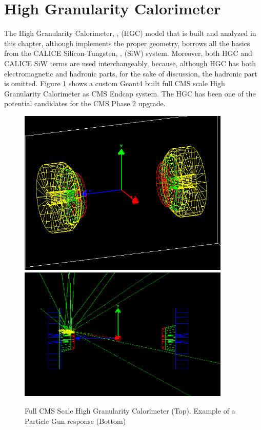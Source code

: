 \section{High Granularity Calorimeter} \label{section:simulations_hgc}
The High Granularity Calorimeter, \cite{Magnan:2017exp}, (HGC) model that is built and analyzed in this chapter, although implements the proper geometry, borrows all the basics from the CALICE Silicon-Tungsten, \cite{Adloff:2008aa}, (SiW) system. Moreover, both {\sc HGC} and {\sc CALICE} SiW terms are used interchangeably, because, although {\sc HGC} has both electromagnetic and hadronic parts, for the sake of discussion, the hadronic part is omitted. Figure \ref{fig:simulations_hgcexamples} shows a custom {\sc Geant4} built full CMS scale High Granularity Calorimeter as CMS Endcap system. The HGC has been one of the potential candidates for the CMS Phase 2 upgrade.
\begin{figure}[htbp]
    \centering
    \includegraphics[width=0.9\textwidth]{figures/ch_simulations/hgc/detetor_3d/HGC_70_20.png}
    \includegraphics[width=0.9\textwidth]{figures/ch_simulations/hgc/detetor_3d/HGCal_1Event_NoSides.png}
    \caption{Full CMS Scale High Granularity Calorimeter (Top). Example of a Particle Gun response (Bottom)}
    \label{fig:simulations_hgcexamples}
 \end{figure}


